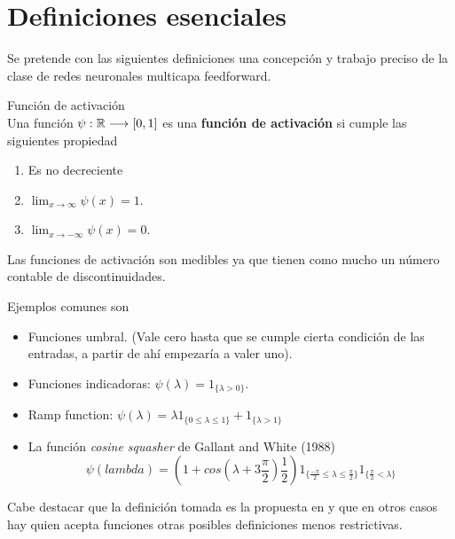 %


\section{Definiciones esenciales}  

Se pretende con las siguientes definiciones una concepción y trabajo preciso de la clase de redes neuronales multicapa feedforward. 


\begin{definicion} Función de activación \\
    Una función  $\psi: \mathbb{R} \longrightarrow [0,1]$ es una \textbf{ función de activación} si  cumple las siguientes propiedad
    \begin{enumerate}[label=(\roman*)]
        \item Es no decreciente
        \item $\lim _{x \rightarrow \infty} \psi(x) = 1
        $.
        \item $\lim _{x \rightarrow -\infty} \psi(x) = 0$.
    \end{enumerate}  

    Las funciones de activación son medibles ya que tienen como mucho un número contable de discontinuidades.
   
    Ejemplos comunes son
    \begin{itemize}
        \item Funciones umbral. 
        (Vale cero hasta que se cumple cierta condición de las entradas, a partir de ahí empezaría a valer uno).

        \item Funciones indicadoras: $\psi(\lambda) = 1_{\{\lambda > 0\}}$. 
        \item Ramp function: $\psi(\lambda)  = \lambda 1_{\{0 \leq \lambda \leq  1\}} + 1_{\{\lambda > 1\}}$
    
        \item La función \textit{cosine squasher} de Gallant and White (1988)
        \begin{equation*}
    \psi(lambda )= (1 + cos(\lambda + 3 \frac{\pi}{2}) \frac{1}{2}) 
     1_{\{\frac{-\pi}{2} \leq \lambda \leq  \frac{\pi}{2}\}}
     1_{\{ \frac{\pi}{2} < \lambda \}}
    \end{equation*}
    \end{itemize}

    Cabe destacar que la definición tomada es la propuesta en \cite{HORNIK1989359} y que en otros casos 
    hay quien acepta funciones otras posibles definiciones menos restrictivas.
\end{definicion}

